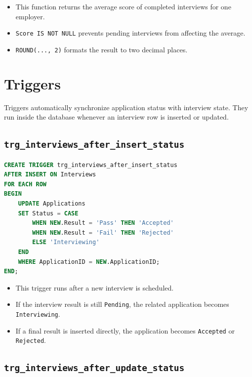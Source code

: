 \documentclass[11pt,a4paper]{report}
\begin{document}
\begin{itemize}[leftmargin=1.2cm,itemsep=0.1em]
  \item This function returns the average score of completed interviews for one employer.
  \item \texttt{Score IS NOT NULL} prevents pending interviews from affecting the average.
  \item \texttt{ROUND(..., 2)} formats the result to two decimal places.
\end{itemize}

\section{Triggers}

Triggers automatically synchronize application status with interview state. They run inside the database whenever an interview row is inserted or updated.

\subsection*{\texttt{trg\_interviews\_after\_insert\_status}}

\begin{lstlisting}[language=SQL,caption={Trigger after inserting an interview}]
CREATE TRIGGER trg_interviews_after_insert_status
AFTER INSERT ON Interviews
FOR EACH ROW
BEGIN
    UPDATE Applications
    SET Status = CASE
        WHEN NEW.Result = 'Pass' THEN 'Accepted'
        WHEN NEW.Result = 'Fail' THEN 'Rejected'
        ELSE 'Interviewing'
    END
    WHERE ApplicationID = NEW.ApplicationID;
END;
\end{lstlisting}

\begin{itemize}[leftmargin=1.2cm,itemsep=0.1em]
  \item This trigger runs after a new interview is scheduled.
  \item If the interview result is still \texttt{Pending}, the related application becomes \texttt{Interviewing}.
  \item If a final result is inserted directly, the application becomes \texttt{Accepted} or \texttt{Rejected}.
\end{itemize}

\subsection*{\texttt{trg\_interviews\_after\_update\_status}}
\end{document}
